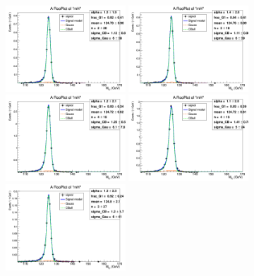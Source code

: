 \begin{figure}
	\begin{center}
		\includegraphics[width=0.40\textwidth]{fig/signal_fit/2016/sigfit_mu_ggF_1_125.png}
		\includegraphics[width=0.40\textwidth]{fig/signal_fit/2016/sigfit_mu_ggF_2_125.png}\\
		\includegraphics[width=0.40\textwidth]{fig/signal_fit/2016/sigfit_mu_ggF_3_125.png}
		\includegraphics[width=0.40\textwidth]{fig/signal_fit/2016/sigfit_mu_ggF_4_125.png}\\
		\includegraphics[width=0.40\textwidth]{fig/signal_fit/2016/sigfit_mu_VBF_501_125.png}

\end{center}
\end{figure}
